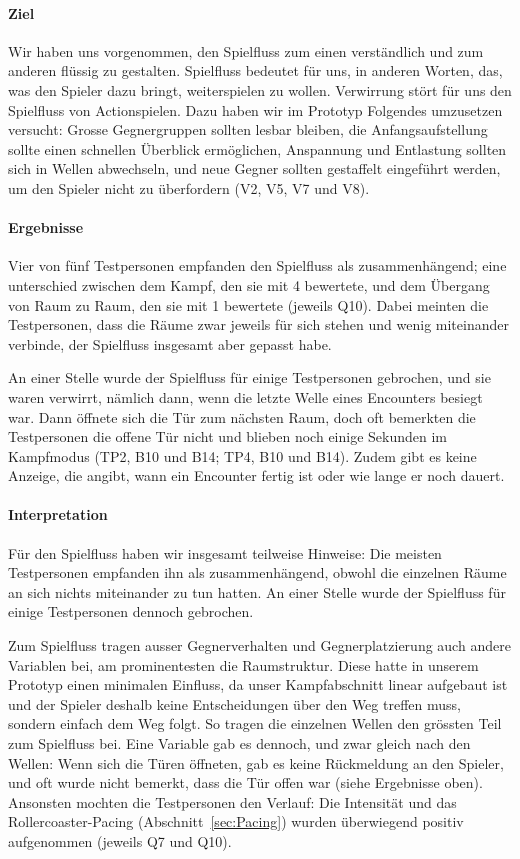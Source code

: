 \documentclass[../Main.tex]{subfiles}
\begin{document}
\paragraph{Ziel}
Wir haben uns vorgenommen, den Spielfluss zum einen verständlich und zum anderen flüssig zu gestalten. Spielfluss bedeutet für uns, in anderen Worten, das, was den Spieler dazu bringt, weiterspielen zu wollen. Verwirrung stört für uns den Spielfluss von Actionspielen. Dazu haben wir im Prototyp Folgendes umzusetzen versucht: Grosse Gegnergruppen sollten lesbar bleiben, die Anfangsaufstellung sollte einen schnellen Überblick ermöglichen, Anspannung und Entlastung sollten sich in Wellen abwechseln, und neue Gegner sollten gestaffelt eingeführt werden, um den Spieler nicht zu überfordern (V2, V5, V7 und V8).

\paragraph{Ergebnisse}
Vier von fünf Testpersonen empfanden den Spielfluss als zusammenhängend; eine unterschied zwischen dem Kampf, den sie mit 4 bewertete, und dem Übergang von Raum zu Raum, den sie mit 1 bewertete (jeweils Q10). Dabei meinten die Testpersonen, dass die Räume zwar jeweils für sich stehen und wenig miteinander verbinde, der Spielfluss insgesamt aber gepasst habe.

An einer Stelle wurde der Spielfluss für einige Testpersonen gebrochen, und sie waren verwirrt, nämlich dann, wenn die letzte Welle eines Encounters besiegt war. Dann öffnete sich die Tür zum nächsten Raum, doch oft bemerkten die Testpersonen die offene Tür nicht und blieben noch einige Sekunden im Kampfmodus (TP2, B10 und B14; TP4, B10 und B14). Zudem gibt es keine Anzeige, die angibt, wann ein Encounter fertig ist oder wie lange er noch dauert.

\paragraph{Interpretation}
Für den Spielfluss haben wir insgesamt teilweise Hinweise: Die meisten Testpersonen empfanden ihn als zusammenhängend, obwohl die einzelnen Räume an sich nichts miteinander zu tun hatten. An einer Stelle wurde der Spielfluss für einige Testpersonen dennoch gebrochen.

Zum Spielfluss tragen ausser Gegnerverhalten und Gegnerplatzierung auch andere Variablen bei, am prominentesten die Raumstruktur. Diese hatte in unserem Prototyp einen minimalen Einfluss, da unser Kampfabschnitt linear aufgebaut ist und der Spieler deshalb keine Entscheidungen über den Weg treffen muss, sondern einfach dem Weg folgt. So tragen die einzelnen Wellen den grössten Teil zum Spielfluss bei. Eine Variable gab es dennoch, und zwar gleich nach den Wellen: Wenn sich die Türen öffneten, gab es keine Rückmeldung an den Spieler, und oft wurde nicht bemerkt, dass die Tür offen war (siehe Ergebnisse oben). Ansonsten mochten die Testpersonen den Verlauf: Die Intensität und das Rollercoaster-Pacing (Abschnitt~\ref{sec:Pacing}) wurden überwiegend positiv aufgenommen (jeweils Q7 und Q10).
\end{document}
